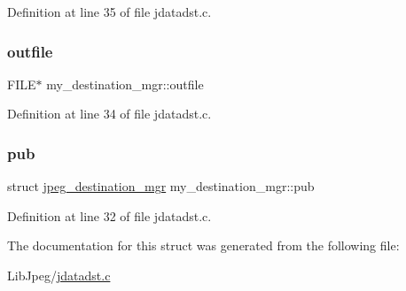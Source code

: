 Definition at line 35 of file jdatadst.\+c.

\mbox{\label{structmy__destination__mgr_a759400870db2885a9c7cf49d8d3ce38e}} 
\subsubsection{\texorpdfstring{outfile}{outfile}}
{\footnotesize\ttfamily F\+I\+LE$\ast$ my\+\_\+destination\+\_\+mgr\+::outfile}



Definition at line 34 of file jdatadst.\+c.

\mbox{\label{structmy__destination__mgr_a79800f27d02bb0446203ecf552034980}} 
\subsubsection{\texorpdfstring{pub}{pub}}
{\footnotesize\ttfamily struct \mbox{\hyperlink{structjpeg__destination__mgr}{jpeg\+\_\+destination\+\_\+mgr}} my\+\_\+destination\+\_\+mgr\+::pub}



Definition at line 32 of file jdatadst.\+c.



The documentation for this struct was generated from the following file\+:\begin{DoxyCompactItemize}
\item 
Lib\+Jpeg/\mbox{\hyperlink{jdatadst_8c}{jdatadst.\+c}}\end{DoxyCompactItemize}
